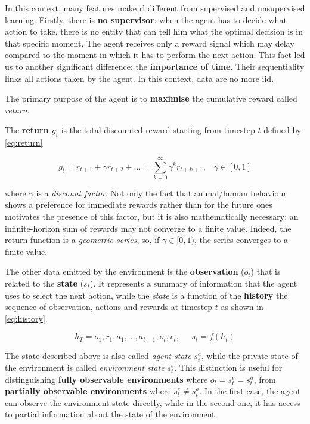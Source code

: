 In this context, many features make \gls{rl} different from supervised and unsupervised learning.
Firstly, there is \textbf{no supervisor}: when the agent has to decide what action to take, there is no entity that can tell him what the optimal decision is in that specific moment. The agent receives only a reward signal which may delay compared to the moment in which it has to perform the next action. 
This fact led us to another significant difference: the \textbf{importance of time}. Their sequentiality links all actions taken by the agent. In this context, data are no more \gls{iid}.

The primary purpose of the agent is to \textbf{maximise} the cumulative reward called \textit{return}.

The \textbf{return $g_t$} is the total discounted reward starting from timestep $t$ defined by \vref{eq:return}

\begin{equation} \label{eq:return}
	g_t = r_{t+1} + \gamma r_{t+2} + \dots = \sum_{k=0}^{\infty} \gamma^k r_{t+k+1}, \;\;\;\gamma \in [0,1]
\end{equation}

where $\gamma$ is a \textit{discount factor}. Not only the fact that animal/human behaviour shows a preference for immediate rewards rather than for the future ones motivates the presence of this factor, but it is also mathematically necessary: an infinite-horizon sum of rewards may not converge to a finite value. Indeed, the return function is a \textit{geometric series}, so, if $\gamma \in [0,1)$, the series converges to a finite value.


The other data emitted by the environment is the \textbf{observation} ($o_t$) that is related to the \textbf{state} ($s_t$). It represents a summary of information that the agent uses to select the next action, while the \textit{state} is a function of the \textbf{history} the sequence of observation, actions and rewards at timestep $t$ as shown in \vref{eq:history}.

\begin{equation}\label{eq:history}
h_T = o_1, r_1, a_1, \dots, a_{t-1}, o_{t}, r_t, \;\;\;\;\; s_t = f(h_t)
\end{equation}

The state described above is also called \textit{agent state} $s_t^a$, while the private state of the environment is called \textit{environment state} $s_t^e$. This distinction is useful for distinguishing \textbf{fully observable environments} where $o_t = s_t^e = s_t^a$, from \textbf{partially observable environments} where $s_t^e \neq s_t^a$.
In the first case, the agent can observe the environment state directly, while in the second one, it has access to partial information about the state of the environment.

